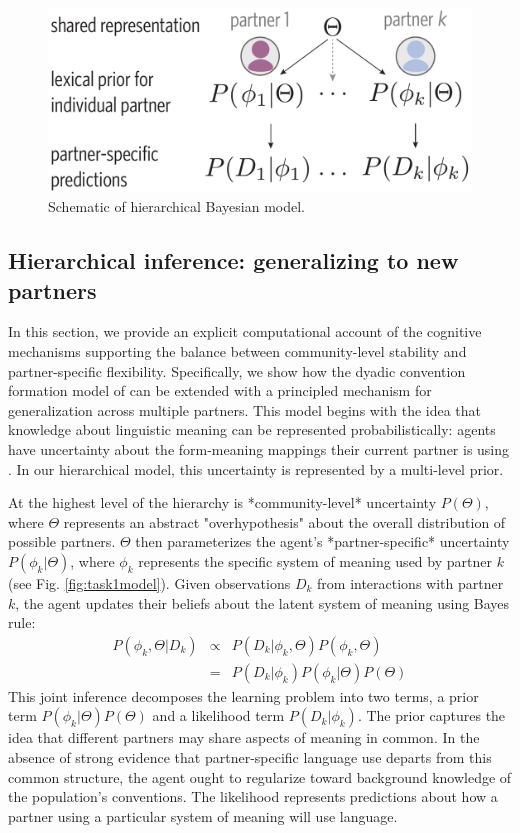 
\begin{figure}
\includegraphics[scale=0.3]{./figures/task1_model.pdf}
\caption{Schematic of hierarchical Bayesian model.}
\label{fig:model_schematic}
\end{figure}

\subsection{Hierarchical inference: generalizing to new partners}

In this section, we provide an explicit computational account of the cognitive mechanisms supporting the balance between community-level stability and partner-specific flexibility.
Specifically, we show how the dyadic convention formation model of \cite{HawkinsetAl2017} can be extended with a principled mechanism for generalization across multiple partners.
This model begins with the idea that knowledge about linguistic meaning can be represented probabilistically: agents have uncertainty about the form-meaning mappings their current partner is using \cite{Bergen2016}. 
In our hierarchical model, this uncertainty is represented by a multi-level prior. 

At the highest level of the hierarchy is *community-level* uncertainty $P(\Theta)$, where $\Theta$ represents an abstract "overhypothesis" about the overall distribution of possible partners. 
$\Theta$ then parameterizes the agent's *partner-specific* uncertainty $P(\phi_{k} | \Theta)$, where $\phi_k$ represents the specific system of meaning used by partner $k$ (see Fig. \ref{fig:task1model}). 
Given observations $D_k$ from interactions with partner $k$, the agent updates their beliefs about the latent system of meaning using Bayes rule:
\begin{equation}
\begin{array}{rcl}
P(\phi_k, \Theta | D_k)  & \propto &  P(D_k | \phi_k, \Theta) P(\phi_k, \Theta) \\
                           & =   & P(D_k | \phi_k) P(\phi_k | \Theta) P(\Theta)
\end{array}
\end{equation}
This joint inference decomposes the learning problem into two terms, a prior term $P(\phi_k | \Theta)P(\Theta)$ and a likelihood term $P(D_k | \phi_k)$.
The prior captures the idea that different partners may share aspects of meaning in common.
In the absence of strong evidence that partner-specific language use departs from this common structure, the agent ought to regularize toward background knowledge of the population's conventions.
The likelihood represents predictions about how a partner using a particular system of meaning will use language.

